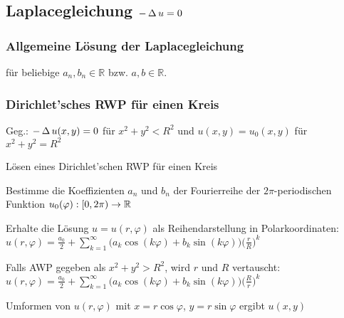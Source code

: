 \documentclass[german,color,5pt]{latex4ei/latex4ei_fs}
\begin{document}
\begin{sectionbox}
	\subsection{Laplacegleichung $-\operatorname{\Delta} u=0$}
	\subsubsection{Allgemeine Lösung der Laplacegleichung}
	für beliebige $a_{n},b_{n} \in \mathbb{R}$ bzw. $a,b \in \mathbb{R}$.
	\subsubsection{Dirichlet'sches RWP für einen Kreis}
	Geg.: $-\operatorname{\Delta} u(x,y)=0$ für $x^2+y^2<R^2$ und $u(x,y)=u_0(x,y)$ für $x^2+y^2=R^2$
	\begin{cookbox}{Lösen eines Dirichlet'schen RWP für einen Kreis}
		\item Bestimme die Koeffizienten $a_n$ und $b_n$ der Fourierreihe der $2\pi$-periodischen Funktion $u_0(\varphi):[0,2\pi)\rightarrow \operatorname{\mathbb R}$
		\item Erhalte die Lösung $u=u(r,\varphi)$ als Reihendarstellung in Polarkoordinaten:\\
		$u(r,\varphi)=\frac{a_0}{2}+\sum_{k=1}^{\infty}\bigl(a_k \cos(k\varphi)+b_k \sin(k\varphi)\bigr)\big(\frac{r}{R}\big)^k$
		\item Falls AWP gegeben als $x^2+y^2>R^2$, wird $r$ und $R$ vertauscht:\\
		$u(r,\varphi)=\frac{a_0}{2}+\sum_{k=1}^{\infty}\bigl(a_k \cos(k\varphi)+b_k \sin(k\varphi)\bigr)\big(\frac{R}{r}\big)^k$
		\item Umformen von $u(r,\varphi)$ mit $x=r\cos\varphi$, $y=r\sin\varphi$ ergibt $u(x,y)$
	\end{cookbox}

\end{sectionbox}
\end{document}
